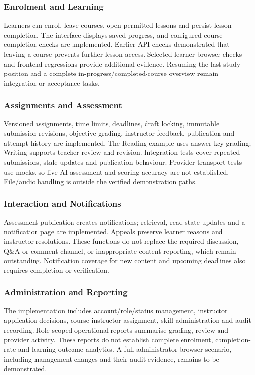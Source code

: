 \subsubsection{Enrolment and Learning}
Learners can enrol, leave courses, open permitted lessons and persist lesson
completion. The interface displays saved progress, and configured course
completion checks are implemented. Earlier API checks demonstrated that
leaving a course prevents further lesson access. Selected learner browser
checks and frontend regressions provide additional evidence. Resuming the
last study position and a complete in-progress/completed-course overview
remain integration or acceptance tasks.

\subsubsection{Assignments and Assessment}
Versioned assignments, time limits, deadlines, draft locking, immutable
submission revisions, objective grading, instructor feedback, publication
and attempt history are implemented. The Reading example uses answer-key
grading; Writing supports teacher review and revision. Integration tests
cover repeated submissions, stale updates and publication behaviour.
Provider transport tests use mocks, so live AI assessment and scoring
accuracy are not established. File/audio handling is outside the verified
demonstration paths.

\subsubsection{Interaction and Notifications}
Assessment publication creates notifications; retrieval, read-state updates
and a notification page are implemented. Appeals preserve learner reasons
and instructor resolutions. These functions do not replace the required
discussion, Q\&A or comment channel, or inappropriate-content reporting,
which remain outstanding. Notification coverage for new content and
upcoming deadlines also requires completion or verification.

\subsubsection{Administration and Reporting}
The implementation includes account/role/status management, instructor
application decisions, course-instructor assignment, skill administration
and audit recording. Role-scoped operational reports summarise grading,
review and provider activity. These reports do not establish complete
enrolment, completion-rate and learning-outcome analytics. A full
administrator browser scenario, including management changes and their
audit evidence, remains to be demonstrated.

